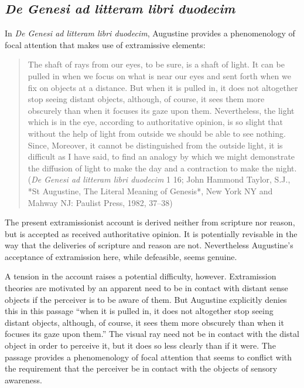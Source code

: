 \documentclass[12pt]{article}
\begin{document}
\subsection{\emph{De Genesi ad litteram libri duodecim}} %
\label{sub:de_genesi_ad_litteram_libri_duodecim}

In \emph{De Genesi ad litteram libri duodecim}, Augustine provides a phenomenology of focal attention that makes use of extramissive elements:
\begin{quote}
	The shaft of rays from our eyes, to be sure, is a shaft of light. It can be pulled in when we focus on what is near our eyes and sent forth when we fix on objects at a distance. But when it is pulled in, it does not altogether stop seeing distant objects, although, of course, it sees them more obscurely than when it focuses its gaze upon them. Nevertheless, the light which is in the eye, according to authoritative opinion, is so slight that without the help of light from outside we should be able to see nothing. Since, Moreover, it cannot be distinguished from the outside light, it is difficult as I have said, to find an analogy by which we might demonstrate the diffusion of light to make the day and a contraction to make the night. (\emph{De Genesi ad litteram libri duodecim} 1 16; John Hammond Taylor, S.J., *St Augustine, The Literal Meaning of Genesis*, New York NY and Mahway NJ: Paulist Press, 1982, 37--38)
\end{quote}
The present extramissionist account is derived neither from scripture nor reason, but is accepted as received authoritative opinion. It is potentially revisable in the way that the deliveries of scripture and reason are not. Nevertheless Augustine's acceptance of extramission here, while defeasible, seems genuine.

A tension in the account raises a potential difficulty, however. Extramission theories are motivated by an apparent need to be in contact with distant sense objects if the perceiver is to be aware of them. But Augustine explicitly denies this in this passage ``when it is pulled in, it does not altogether stop seeing distant objects, although, of course, it sees them more obscurely than when it focuses its gaze upon them.'' The visual ray need not be in contact with the distal object in order to perceive it, but it does so less clearly than if it were. The passage provides a phenomenology of focal attention that seems to conflict with the requirement that the perceiver be in contact with the objects of sensory awareness.
\end{document}
